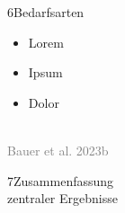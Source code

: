\documentclass[xcolor=table,9pt,aspectratio=169]{beamer}
\begin{document}
\begin{frame}{\vspace*{10mm}6\hspace*{1em}Bedarfsarten}
\begin{multicols}{2}
\begin{itemize}
   \item Lorem
   \item Ipsum
   \item Dolor
\end{itemize}
\vfill

\begin{center}
   \vspace{1cm}
   \\
   \footnotesize{\textcolor{gray}{Bauer et al. 2023b}}
   \vspace{1cm}
\end{center}
\end{multicols}
\end{frame}


\begin{frame}
\begin{overlayarea}{\textwidth}{0.81\paperheight}{
   \vspace*{11mm}
   \textcolor{uolblue}
   {7\hspace*{1em}Zusammenfassung\\\hspace*{1.5em}zentraler Ergebnisse}
}
\vspace*{7mm}
\end{overlayarea}
\end{frame}
\end{document}
